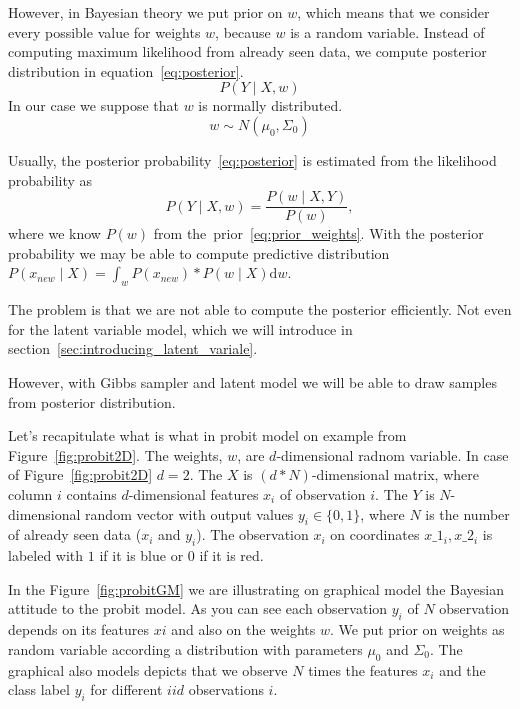 However, in Bayesian theory we put prior on $w$, which means that we consider every possible value for weights $w$, because $w$ is a random variable. 
Instead of computing maximum likelihood from already seen data, we compute posterior distribution in equation~\ref{eq:posterior}.
\begin{equation}\label{eq:posterior}
    P(Y \mid X, w) 
\end{equation}
In our case we suppose that $w$ is normally distributed.
\begin{equation}\label{eq:prior_weights}
w \sim N(\mu_0, \Sigma_0)
\end{equation}

Usually, the posterior probability~\ref{eq:posterior} is estimated from the likelihood probability as
\begin{equation}
    P(Y \mid X, w) = \frac{P(w \mid X,Y)}{P(w)},
\end{equation}
where we know $P(w)$ from the~prior~\ref{eq:prior_weights}.
With the posterior probability we may be able to compute predictive distribution 
$P(x_{new} \mid X) = \int_w P(x_{new}) * P(w \mid X) \mathrm{d} w $.

The problem is that we are not able to compute the posterior efficiently. 
Not even for the latent variable model, which we will introduce in section~\ref{sec:introducing_latent_variale}.

However, with Gibbs sampler and latent model we will be able to draw samples from posterior distribution.

Let's recapitulate what is what in probit model on example from Figure~\ref{fig:probit2D}.
The weights, $w$, are $d$-dimensional radnom variable. In case of Figure~\ref{fig:probit2D} $d=2$.
The $X$ is $(d*N)$-dimensional matrix, where column $i$ contains $d$-dimensional features $x_i$ of observation $i$.
The $Y$ is $N$-dimensional random vector with output values $y_i \in \{0,1\}$, where $N$ is the number of already seen data ($x_i$ and $y_i$).
The observation $x_i$ on coordinates $x\_1_i,x\_2_i$ is labeled with $1$ if it is blue or $0$ if it is red.

In the Figure~\ref{fig:probitGM} we are illustrating on graphical model the Bayesian attitude to the probit model.
As you can see each observation $y_i$ of $N$ observation depends on its features $xi$ and also on the weights $w$.
We put prior on weights as random variable according a distribution with parameters $\mu_0$ and $\Sigma_0$.
The graphical also models depicts that we observe 
$N$ times the features $x_i$ and the class label $y_i$ for different $iid$ observations $i$.

